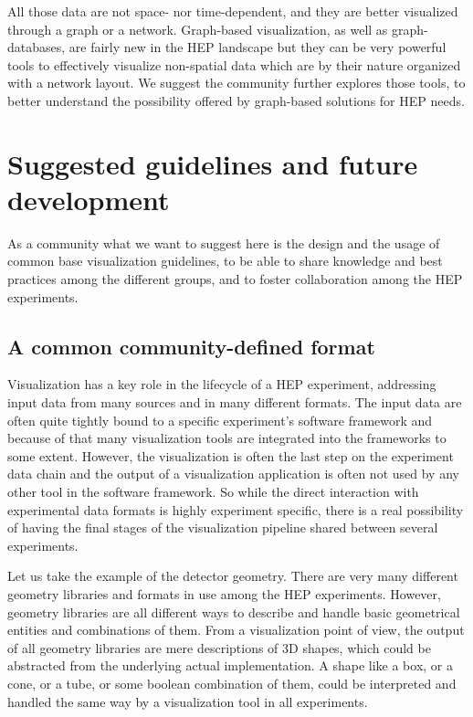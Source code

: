 \documentclass[12pt,a4paper]{article}
\begin{document}
All those data are not space- nor time-dependent, and they are better visualized through a graph or a network. Graph-based visualization,
as well as graph-databases, are fairly new in the HEP landscape but they can be very powerful tools to effectively visualize
non-spatial data which are by their nature organized with a network layout. We suggest the community further explores those tools,
to better understand the possibility offered by graph-based solutions for HEP needs.



\hypertarget{suggested-guidelines}{%
\section{Suggested guidelines and future development}\label{suggested-guidelines}}

As a community what we want to suggest here is the design and the usage of common base visualization guidelines,
to be able to share knowledge and best practices among the different groups, and to foster collaboration among the HEP experiments.

\hypertarget{common-format}{%
\subsection{A common community-defined format}\label{common-format}}

Visualization has a key role in the lifecycle of a HEP experiment, addressing input data from many sources and in many different formats.
The input data are often quite tightly bound to a specific experiment's software framework and because of that many visualization tools
are integrated into the frameworks to some extent. However, the visualization is often the last step on the experiment data chain and the
output of a visualization application is often not used by any other tool in the software framework. So while the direct interaction with experimental data
formats is highly experiment specific, there is a real possibility of having the final stages of the visualization pipeline
shared between several experiments.

Let us take the example of the detector geometry. There are very many different geometry libraries and formats in use among the HEP experiments.
However, geometry libraries are all different ways to describe and handle basic geometrical entities and combinations of them.
From a visualization point of view, the output of all geometry libraries are mere descriptions of 3D shapes, which could be abstracted
from the underlying actual implementation. A shape like a box, or a cone, or a tube, or some boolean combination of them, could be
interpreted and handled the same way by a visualization tool in all experiments.
\end{document}
